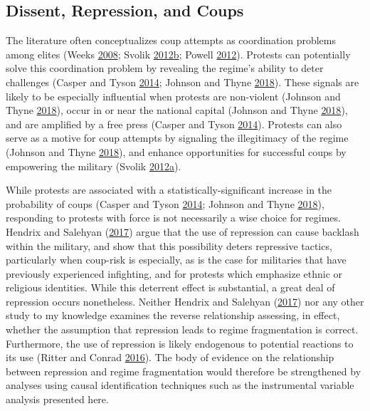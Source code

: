 \documentclass[12pt,]{article}
\theoremstyle{definition}
\theoremstyle{definition}
\theoremstyle{definition}
\theoremstyle{remark}
\begin{document}
\hypertarget{dissent-repression-and-coups}{%
\subsection{Dissent, Repression, and
Coups}\label{dissent-repression-and-coups}}

The literature often conceptualizes coup attempts as coordination
problems among elites (Weeks \protect\hyperlink{ref-Weeks2008}{2008};
Svolik
\protect\hyperlink{ref-Svolik2012d}{2012}\protect\hyperlink{ref-Svolik2012d}{b};
Powell \protect\hyperlink{ref-Powell2012a}{2012}). Protests can
potentially solve this coordination problem by revealing the regime's
ability to deter challenges (Casper and Tyson
\protect\hyperlink{ref-Casper2014}{2014}; Johnson and Thyne
\protect\hyperlink{ref-Johnson2018}{2018}). These signals are likely to
be especially influential when protests are non-violent (Johnson and
Thyne \protect\hyperlink{ref-Johnson2018}{2018}), occur in or near the
national capital (Johnson and Thyne
\protect\hyperlink{ref-Johnson2018}{2018}), and are amplified by a free
press (Casper and Tyson \protect\hyperlink{ref-Casper2014}{2014}).
Protests can also serve as a motive for coup attempts by signaling the
illegitimacy of the regime (Johnson and Thyne
\protect\hyperlink{ref-Johnson2018}{2018}), and enhance opportunities
for successful coups by empowering the military (Svolik
\protect\hyperlink{ref-Svolik2012e}{2012}\protect\hyperlink{ref-Svolik2012e}{a}).

While protests are associated with a statistically-significant increase
in the probability of coups (Casper and Tyson
\protect\hyperlink{ref-Casper2014}{2014}; Johnson and Thyne
\protect\hyperlink{ref-Johnson2018}{2018}), responding to protests with
force is not necessarily a wise choice for regimes. Hendrix and Salehyan
(\protect\hyperlink{ref-Hendrix2017}{2017}) argue that the use of
repression can cause backlash within the military, and show that this
possibility deters repressive tactics, particularly when coup-risk is
especially, as is the case for militaries that have previously
experienced infighting, and for protests which emphasize ethnic or
religious identities. While this deterrent effect is substantial, a
great deal of repression occurs nonetheless. Neither Hendrix and
Salehyan (\protect\hyperlink{ref-Hendrix2017}{2017}) nor any other study
to my knowledge examines the reverse relationship assessing, in effect,
whether the assumption that repression leads to regime fragmentation is
correct. Furthermore, the use of repression is likely endogenous to
potential reactions to its use (Ritter and Conrad
\protect\hyperlink{ref-Ritter2016}{2016}). The body of evidence on the
relationship between repression and regime fragmentation would therefore
be strengthened by analyses using causal identification techniques such
as the instrumental variable analysis presented here.
\end{document}

